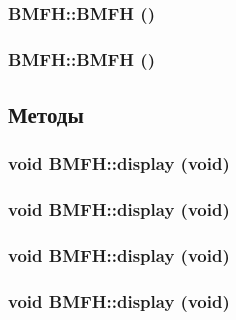 \hypertarget{class_b_m_f_h_fde965142b7c9c4f358175c2438e8668}{
\subsubsection[{BMFH}]{\setlength{\rightskip}{0pt plus 5cm}BMFH::BMFH ()}}
\label{class_b_m_f_h_fde965142b7c9c4f358175c2438e8668}


\hypertarget{class_b_m_f_h_fde965142b7c9c4f358175c2438e8668}{
\subsubsection[{BMFH}]{\setlength{\rightskip}{0pt plus 5cm}BMFH::BMFH ()}}
\label{class_b_m_f_h_fde965142b7c9c4f358175c2438e8668}




\subsection{Методы}
\hypertarget{class_b_m_f_h_66ce85f14dfc812a2692a227af6cb225}{
\subsubsection[{display}]{\setlength{\rightskip}{0pt plus 5cm}void BMFH::display (void)}}
\label{class_b_m_f_h_66ce85f14dfc812a2692a227af6cb225}


\hypertarget{class_b_m_f_h_66ce85f14dfc812a2692a227af6cb225}{
\subsubsection[{display}]{\setlength{\rightskip}{0pt plus 5cm}void BMFH::display (void)}}
\label{class_b_m_f_h_66ce85f14dfc812a2692a227af6cb225}


\hypertarget{class_b_m_f_h_66ce85f14dfc812a2692a227af6cb225}{
\subsubsection[{display}]{\setlength{\rightskip}{0pt plus 5cm}void BMFH::display (void)}}
\label{class_b_m_f_h_66ce85f14dfc812a2692a227af6cb225}


\hypertarget{class_b_m_f_h_66ce85f14dfc812a2692a227af6cb225}{
\subsubsection[{display}]{\setlength{\rightskip}{0pt plus 5cm}void BMFH::display (void)}}
\label{class_b_m_f_h_66ce85f14dfc812a2692a227af6cb225}


